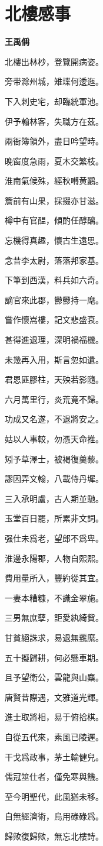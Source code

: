 \documentclass[12pt,a4paper]{ctexbook}
\begin{document}
\section{北樓感事}
\textbf{王禹偁}\par\vspace{0.5em}
北樓出林杪，登覽開病姿。\par
旁带滁州城，雉堞何逶迤。\par
下入刺史宅，却臨統軍池。\par
伊予翰林客，失職方在茲。\par
兩衙簿領外，盡日吟望時。\par
晚窗度急雨，夏木交繁枝。\par
淮南氣候殊，經秋囀黄鸝。\par
簷前有山果，採掇亦甘滋。\par
樽中有官醖，傾酌任醇醨。\par
忘機得真趣，懷古生遠思。\par
念昔李太尉，落落邦家基。\par
下筆到西漢，料兵如六奇。\par
謫官來此郡，鬰鬰持一麾。\par
嘗作懷嵩樓，記文悲盛衰。\par
甚得進退理，深明禍福機。\par
未幾再入用，斯言忽如遺。\par
君恩匪膠柱，天殃若影隨。\par
六月萬里行，炎荒竟不歸。\par
功成又名遂，不退將安之。\par
姑以人事較，勿憑天命推。\par
矧予草澤士，被褐復羹藜。\par
謬因弄文翰，八載侍丹墀。\par
三入承明盧，古人期並馳。\par
玉堂百日罷，所累非文詞。\par
强仕未爲老，望郎不爲卑。\par
淮邊永陽郡，人物自熙熙。\par
費用量所入，豐約從其宜。\par
一妻本糟糠，不識金翠施。\par
三男無庶孽，詎愛紈綺貲。\par
甘貧絕誅求，易退無覊縻。\par
五十擬歸耕，何必懸車期。\par
且予望衛公，雲龍與山麋。\par
唐賢昔際遇，文雅道光輝。\par
進士取將相，易于俯拾棋。\par
自從五代來，素風已陵遲。\par
干戈爲政事，茅土輸健兒。\par
儒冠筮仕者，僅免寒與饑。\par
至今明聖代，此風猶未移。\par
自無經濟術，烏用碌碌爲。\par
歸歟復歸歟，無忘北樓詩。\par
\end{document}
